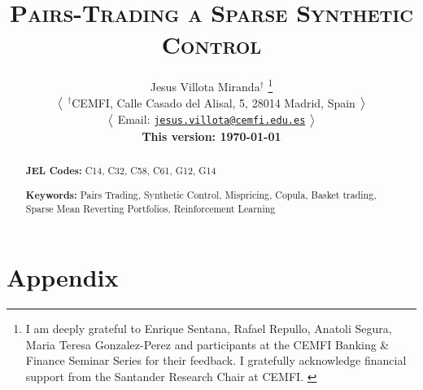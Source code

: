 \documentclass[12pt,a4paper]{article}
\title{
\textsc{
\Large 
Pairs-Trading a Sparse Synthetic Control
}
}
\author[1]{
{  
{
\large 
Jesus Villota Miranda}$^{\dagger}$
\footnote{
\scriptsize{
I am deeply grateful to Enrique Sentana, Rafael Repullo, Anatoli Segura, Maria Teresa Gonzalez-Perez and participants at the CEMFI Banking \& Finance Seminar Series for their feedback.
I gratefully acknowledge financial support from the Santander Research Chair at CEMFI.
}
}
}

\bx 
{\small
$\big{<}$
\noindent $^{\dagger}$CEMFI, Calle Casado del Alisal, 5, 28014 Madrid, Spain 
$\big{>}$

$\big{<}$
Email: \href{mailto:jesus.villota@cemfi.edu.es}{\texttt{jesus.villota@cemfi.edu.es}}
$\big{>}$

\small \textbf{This version: \mydate\today}
}
}
\date{}
\begin{document}
\maketitle
\thispagestyle{empty}
\begin{abstract}
 

\bx 
\noindent\textbf{JEL Codes:} C14, C32, C58, C61, G12, G14

\mx 
\noindent\textbf{Keywords:} 
Pairs Trading, 
Synthetic Control, 
Mispricing, 
Copula, 
Basket trading, 
Sparse Mean Reverting Portfolios, 
Reinforcement Learning
\end{abstract}

\newpage
\setcounter{page}{1}

%

%


%

%

%

%




\newpage
\processdelayedfloats 
\renewcommand{\thefigure}{A\arabic{figure}} 
\renewcommand{\thetable}{A\arabic{table}}

\appendix
\newpage
\section{Appendix}

\end{document}

